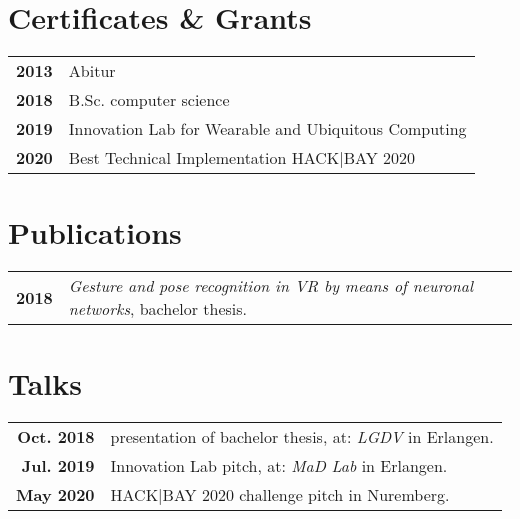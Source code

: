 \documentclass[grey]{hipstercv}
\begin{document}
\begin{paracol}{2}
\begin{minipage}[t]{0.3\textwidth}
\section*{Certificates \& Grants}
\begin{tabular}{>{\footnotesize\bfseries}r >{\footnotesize}p{}}
    2013 & Abitur\\
    2018 & B.Sc. computer science \\
    2019 & Innovation Lab for Wearable and Ubiquitous Computing\\
    2020 &  Best Technical Implementation HACK|BAY 2020
\end{tabular}
\end{minipage}\hfill
\begin{minipage}[t]{0.3\textwidth}
\section*{Publications}
\begin{tabular}{>{\footnotesize\bfseries}r >{\footnotesize}p{}}
    2018 & \emph{Gesture and pose recognition in VR by means of neuronal networks}, bachelor thesis. 
\end{tabular}
\section*{Talks}
\begin{tabular}{>{\footnotesize\bfseries}r >{\footnotesize}p{}}
    Oct. 2018& presentation of bachelor thesis, at: \emph{LGDV} in Erlangen. \\
    Jul. 2019& Innovation Lab pitch, at: \emph{MaD Lab} in Erlangen.\\
    May 2020& HACK|BAY 2020 challenge pitch in Nuremberg.
\end{tabular}
\end{minipage}










\end{paracol}
\end{document}
